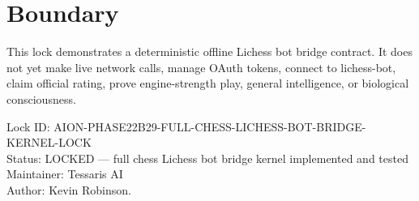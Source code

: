 \documentclass[11pt,a4paper]{article}
\begin{document}
\section{Boundary}

This lock demonstrates a deterministic offline Lichess bot bridge contract. It does not yet make live network calls, manage OAuth tokens, connect to lichess-bot, claim official rating, prove engine-strength play, general intelligence, or biological consciousness.

\bigskip

\noindent
Lock ID: AION-PHASE22B29-FULL-CHESS-LICHESS-BOT-BRIDGE-KERNEL-LOCK\\
Status: LOCKED --- full chess Lichess bot bridge kernel implemented and tested\\
Maintainer: Tessaris AI\\
Author: Kevin Robinson.
\end{document}
